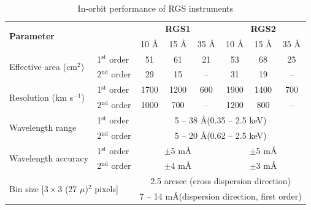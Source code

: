 				
			\begin{table}[h!]
				\centering
				\caption{In-orbit performance of RGS instruments}
				\label{xmm-rgs-performance}
				\begin{tabular}{l|l|ccc|ccc}
					\hline
					\multicolumn{2}{l|}{\multirow{2}{*}{\textbf{Parameter}}} & \multicolumn{3}{c|}{\textbf{RGS1}} & \multicolumn{3}{c}{\textbf{RGS2}} \\ \cline{3-8}
					\multicolumn{2}{l|}{} & {10 \AA} & {15 \AA} & {35 \AA} & {10 \AA} & {15 \AA} & {35 \AA} \\ \hline
					\multirow{2}{*}{Effective area (cm$^2$)} & {1$^\text{st}$ order} & {51} & {61} & {21} & {53} & {68} & {25} \\ %
															 & {2$^\text{nd}$ order} & {29} & {15} & {--} & {31} & {19} & {--} \\ \hline
					\multirow{2}{*}{Resolution (km s$^{-1}$)}& {1$^\text{st}$ order} & {1700} & {1200} & {600} & {1900} & {1400} & {700} \\ %
															 & {2$^\text{nd}$ order} & {1000} & {700} & {--} & {1200} & {800} & {--} \\ \hline
					\multirow{2}{*}{Wavelength range} & {1$^\text{st}$ order} & \multicolumn{6}{c}{5 -- 38 \AA (0.35 -- 2.5 keV)} \\ %
													   & {2$^\text{nd}$ order} & \multicolumn{6}{c}{5 -- 20 \AA (0.62 -- 2.5 keV)} \\ \hline
					\multirow{2}{*}{Wavelength accuracy} & {1$^\text{st}$ order} & \multicolumn{3}{c}{$\pm$5 m\AA} & \multicolumn{3}{c}{$\pm$5 m\AA} \\ %
	                                                  	  & {2$^\text{nd}$ order} & \multicolumn{3}{c}{$\pm$4 m\AA} & \multicolumn{3}{c}{$\pm$3 m\AA} \\ \hline
					\multicolumn{2}{l|}{\multirow{2}{*}{Bin size {[}$3\times 3$ (27 $\mu$)$^2$ pixels{]}}} & \multicolumn{6}{c}{2.5 arcsec (cross dispersion direction)} \\ %
					\multicolumn{2}{l|}{} & \multicolumn{6}{c}{7 -- 14 m\AA (dispersion direction, first order)} \\ \hline
				\end{tabular}
			\end{table}
			
